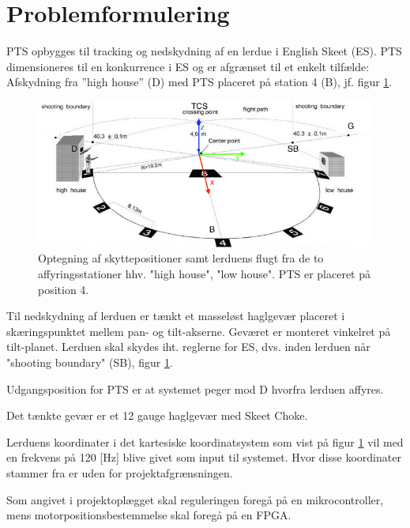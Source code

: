 \section{Problemformulering}
\label{sec:problemformulering}

PTS opbygges til tracking og nedskydning af en lerdue i English Skeet (ES). PTS dimensioneres til en konkurrence i ES og er afgrænset til et enkelt tilfælde:
Afskydning fra ”high house” (D) med PTS placeret på station 4 (B), jf. figur \ref{fig:ES}.
\begin{figure}[th!]
\centering
\includegraphics[width=1\textwidth]{./graphics/skeet_diagram_cropped_axes}
\caption[Skitse af English Skeet]{Optegning af skyttepositioner samt lerduens flugt fra de to affyringsstationer hhv. "high house", "low house". PTS er placeret på position 4.}
\label{fig:ES}
\end{figure}	


Til nedskydning af lerduen er tænkt et masseløst haglgevær placeret i skæringspunktet mellem pan- og tilt-akserne.
Geværet er monteret vinkelret på tilt-planet. 
Lerduen skal skydes iht. reglerne for ES, dvs. inden lerduen når "shooting boundary" (SB), figur \ref{fig:ES}.

Udgangsposition for PTS er at systemet peger mod D hvorfra lerduen affyres.

Det tænkte gevær er et 12 gauge haglgevær med Skeet Choke.

Lerduens koordinater i det kartesiske koordinatsystem som vist på figur \ref{fig:ES}
vil med en frekvens på 120 [Hz] blive givet som input til systemet. 
Hvor disse koordinater stammer fra er uden for projektafgrænsningen.

Som angivet i projektoplægget skal reguleringen foregå på en mikrocontroller,
mens motorpositionsbestemmelse skal foregå på en FPGA.